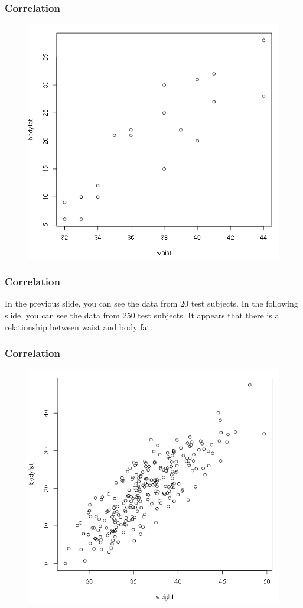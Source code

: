 \documentclass[xcolor=dvipsnames]{beamer}
\begin{document}
\begin{frame}
  \frametitle{Correlation}
\begin{figure}[h]
\includegraphics[scale=.35]{./diagrams/bf-01.png}
\end{figure}
\end{frame}

\begin{frame}
  \frametitle{Correlation}
  In the previous slide, you can see the data from 20 test subjects.
  In the following slide, you can see the data from 250 test subjects. It appears that there is a
  relationship between waist and body fat.
\end{frame}

\begin{frame}
  \frametitle{Correlation}
\begin{figure}[h]
\includegraphics[scale=.35]{./diagrams/bf-02.png}
\end{figure}
\end{frame}
\end{document}

